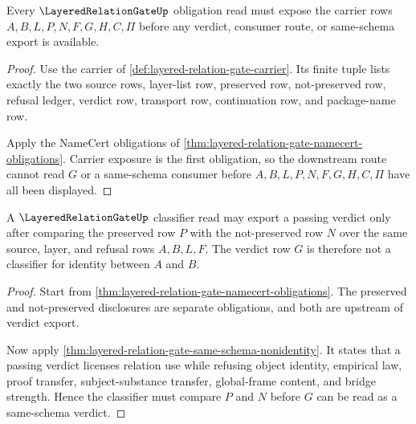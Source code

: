 \begin{theorem}
\label{thm:layered-relation-gate-carrier-obligation}
Every $\LayeredRelationGateUp$ obligation read must expose the carrier rows $A,B,L,P,N,F,G,H,C,\Pi$ before any verdict, consumer route, or same-schema export is available.
\end{theorem}
\begin{proof}
Use the carrier of \autoref{def:layered-relation-gate-carrier}. Its finite tuple lists exactly the two source rows, layer-list row, preserved row, not-preserved row, refusal ledger, verdict row, transport row, continuation row, and package-name row.

Apply the NameCert obligations of \autoref{thm:layered-relation-gate-namecert-obligations}. Carrier exposure is the first obligation, so the downstream route cannot read $G$ or a same-schema consumer before $A,B,L,P,N,F,G,H,C,\Pi$ have all been displayed.
\end{proof}

\begin{theorem}
\label{thm:layered-relation-gate-classifier-obligation}
A $\LayeredRelationGateUp$ classifier read may export a passing verdict only after comparing the preserved row $P$ with the not-preserved row $N$ over the same source, layer, and refusal rows $A,B,L,F$. The verdict row $G$ is therefore not a classifier for identity between $A$ and $B$.
\end{theorem}
\begin{proof}
Start from \autoref{thm:layered-relation-gate-namecert-obligations}. The preserved and not-preserved disclosures are separate obligations, and both are upstream of verdict export.

Now apply \autoref{thm:layered-relation-gate-same-schema-nonidentity}. It states that a passing verdict licenses relation use while refusing object identity, empirical law, proof transfer, subject-substance transfer, global-frame content, and bridge strength. Hence the classifier must compare $P$ and $N$ before $G$ can be read as a same-schema verdict.
\end{proof}

